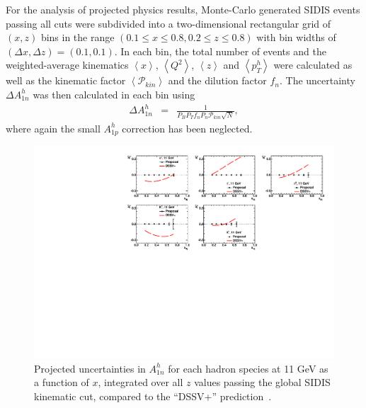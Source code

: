 For the analysis of projected physics results, Monte-Carlo generated SIDIS events passing all cuts were subdivided into a two-dimensional rectangular grid of $(x,z)$ bins in the range $(0.1 \le x \le 0.8, 0.2 \le z \le 0.8)$ with bin widths of $(\Delta x, \Delta z) = (0.1, 0.1)$. In each bin, the total number of events and the weighted-average kinematics $\left<x\right>$, $\left<Q^2\right>$, $\left<z\right>$ and $\left<p_T^h\right>$ were calculated as well as the kinematic factor $\left<\mathcal{P}_{kin}\right>$ and the dilution factor $f_n$. The uncertainty $\Delta A_{1n}^h$ was then calculated in each bin using 
\begin{eqnarray}
  \Delta A_{1n}^h &=& \frac{1}{P_BP_T f_n P_n \mathcal{P}_{kin}\sqrt{N}}\label{da1nh}, 
\end{eqnarray}
where again the small $A_{1p}^h$ correction has been neglected. 

\begin{figure}[h]
  \begin{center}
    \includegraphics[width=.98\textwidth]{figures/Projections1D_summary11gev.pdf}
  \end{center}
  \caption{\label{projections1D_11gev} Projected uncertainties in $A_{1n}^h$ for each hadron species at 11 GeV as a function of $x$, integrated over all $z$ values passing the global SIDIS kinematic cut, compared to the ``DSSV+'' prediction~\cite{DSSVplus}.}
\end{figure}

